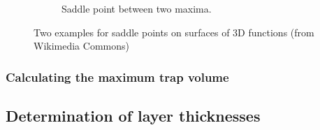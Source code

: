 \begin{figure}[h]
\begin{subfigure}{.5\textwidth}
					\caption{Saddle point between two maxima.}\label{fig:saddle_point_between_maxima} 
				\end{subfigure}
				\caption{Two examples for saddle points on surfaces of 3D functions (from Wikimedia Commons)}
			\end{figure}
						
			
			\subsubsection{Calculating the maximum trap volume}
		
		
		\subsection{Determination of layer thicknesses}